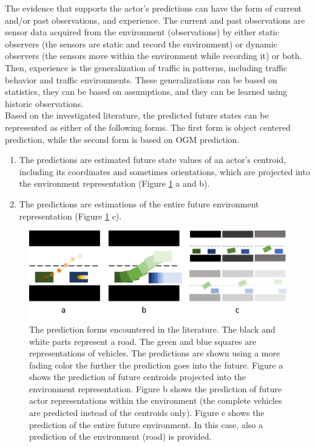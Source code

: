 The evidence that supports the actor's predictions can have the form of current and/or past observations, and experience. The current and past observations are sensor data acquired from the environment (observations) by either static observers (the sensors are static and record the environment) or dynamic observers (the sensors move within the environment while recording it) or both.
Then, experience is the generalization of traffic in patterns, including traffic behavior and traffic environments. These generalizations can be based on statistics, they can be based on assumptions, and they can be learned using historic observations. \\

Based on the investigated literature, the predicted future states can be represented as either of the following forms. The first form is object centered prediction, while the second form is based on \gls{OGM} prediction. 

\begin{enumerate}
	\item The predictions are estimated future state values of an actor's centroid, including its coordinates and sometimes orientations, which are projected into the environment representation (Figure \ref{fig:pred_froms} a and b). \cite{cui2019multimodal} \cite{djuric2020uncertainty} \cite{rhinehart2019precog} \cite{kawasaki2021multimodal} \cite{li2020end} \cite{luo2018fast}
	\item The predictions are estimations of the entire future environment representation (Figure \ref{fig:pred_froms} c). \cite{itkina2019dynamic} \cite{lange2020attention} \cite{toyungyernsub2020double} \cite{mohajerin2019multi} \cite{dequaire2018deep} \cite{wu2020motionnet} \cite{hoermann2018dynamic} \cite{schreiber2019long}
\end{enumerate}

\begin{figure}[h!]
	\centering
	\includegraphics[width=0.8\linewidth]{Figures/Introduction/Prediction_forms}
	\caption{The prediction forms encountered in the literature. The black and white parts represent a road. The green and blue squares are representations of vehicles. The predictions are shown using a more fading color the further the prediction goes into the future. Figure a shows the prediction of future centroids projected into the environment representation. Figure b shows the prediction of future actor representations within the environment (the complete vehicles are predicted instead of the centroids only). Figure c shows the prediction of the entire future environment. In this case, also a prediction of the environment (road) is provided.}  
	\label{fig:pred_froms}
\end{figure}

